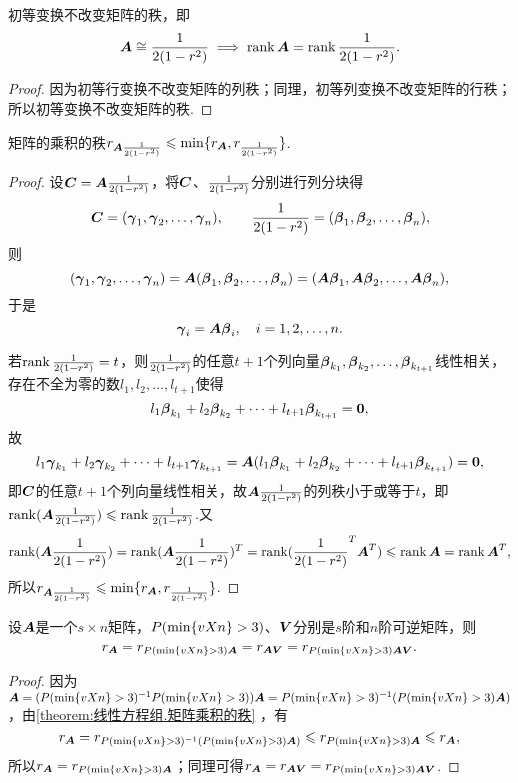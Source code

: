 \begin{theorem}\label{theorem:线性方程组.初等变换不变秩}
初等变换不改变矩阵的秩，即\[
\A\cong\B \implies \rank\A=\rank\B.
\]
\begin{proof}
因为初等行变换不改变矩阵的列秩；同理，初等列变换不改变矩阵的行秩；所以初等变换不改变矩阵的秩.
\end{proof}
\end{theorem}

\begin{theorem}\label{theorem:线性方程组.矩阵乘积的秩}
矩阵的乘积的秩\(r_{\A\B} \leqslant \min\{r_{\A},r_{\B}\}\).
\begin{proof}
\def\b#1{\mat{\beta}_{#1}}
\def\g#1{\mat{\gamma}_{#1}}
\def\bs{(\b1,\b2,\dotsc,\b n)}
\def\gs{(\g1,\g2,\dotsc,\g n)}
设\(\C = \A\B\)，将\(\C\)、\(\B\)分别进行列分块得\[
\C = \gs,
\qquad
\B = \bs,
\]则\[
\gs = \A \bs = (\A\b1,\A\b2,\dotsc,\A\b n),
\]于是\[
\g i = \A \b i,
\quad i=1,2,\dotsc,n.
\]

若\(\rank\B = t\)，则\(\B\)的任意\(t+1\)个列向量\(\b{k_1},\b{k_2},\dotsc,\b{k_{t+1}}\)线性相关，存在不全为零的数\(l_1,l_2,\dotsc,l_{t+1}\)使得\[
l_1 \b{k_1} + l_2 \b{k_2} + \dotsb + l_{t+1} \b{k_{t+1}} = \z,
\]故\[
l_1 \g{k_1} + l_2 \g{k_2} + \dotsb + l_{t+1} \g{k_{t+1}}
= \A(l_1 \b{k_1} + l_2 \b{k_2} + \dotsb + l_{t+1} \b{k_{t+1}})
= \z,
\]即\(\C\)的任意\(t+1\)个列向量线性相关，故\(\A\B\)的列秩小于或等于\(t\)，即\(\rank(\A\B) \leqslant \rank\B\).又\[
\rank(\A\B) = \rank(\A\B)^T = \rank(\B^T \A^T) \leqslant \rank \A = \rank \A^T,
\]所以\(r_{\A\B} \leqslant \min\{r_{\A},r_{\B}\}\).
\end{proof}
\end{theorem}

\begin{corollary}
设\(\A\)是一个\(s \times n\)矩阵，\(\P\)、\(\Q\)分别是\(s\)阶和\(n\)阶可逆矩阵，则\[
r_{\A} = r_{\P \A} = r_{\A \Q} = r_{\P \A \Q}.
\]
\begin{proof}
因为\(\A = (\P^{-1} \P) \A = \P^{-1} (\P \A)\)，由\cref{theorem:线性方程组.矩阵乘积的秩} ，有\[
r_{\A} = r_{\P^{-1} (\P \A)} \leqslant r_{\P \A} \leqslant r_{\A},
\]所以\(r_{\A} = r_{\P \A}\)；同理可得\(r_{\A} = r_{\A \Q} = r_{\P \A \Q}\).
\end{proof}
\end{corollary}

